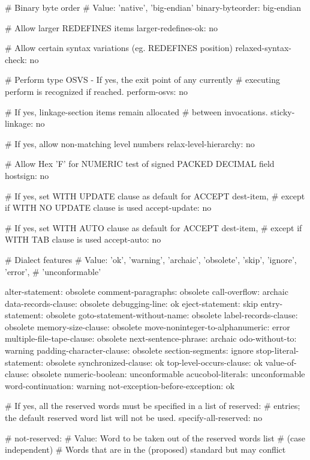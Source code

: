 # Binary byte order
# Value: 'native', 'big-endian'
binary-byteorder:		big-endian

# Allow larger REDEFINES items
larger-redefines-ok:		no

# Allow certain syntax variations (eg. REDEFINES position)
relaxed-syntax-check:		no

# Perform type OSVS - If yes, the exit point of any currently
# executing perform is recognized if reached.
perform-osvs:			no

# If yes, linkage-section items remain allocated
# between invocations.
sticky-linkage:			no

# If yes, allow non-matching level numbers
relax-level-hierarchy:		no

# Allow Hex 'F' for NUMERIC test of signed PACKED DECIMAL field
hostsign:			no

# If yes, set WITH UPDATE clause as default for ACCEPT dest-item,
# except if WITH NO UPDATE clause is used
accept-update:		no

# If yes, set WITH AUTO clause as default for ACCEPT dest-item,
# except if WITH TAB clause is used
accept-auto:		no

# Dialect features
# Value: 'ok', 'warning', 'archaic', 'obsolete', 'skip', 'ignore', 'error',
#        'unconformable'

alter-statement:			obsolete
comment-paragraphs:			obsolete
call-overflow:				archaic
data-records-clause:			obsolete
debugging-line:				ok
eject-statement:			skip
entry-statement:			obsolete
goto-statement-without-name:		obsolete
label-records-clause:			obsolete
memory-size-clause:			obsolete
move-noninteger-to-alphanumeric:	error
multiple-file-tape-clause:		obsolete
next-sentence-phrase:			archaic
odo-without-to:				warning
padding-character-clause:		obsolete
section-segments:			ignore
stop-literal-statement:			obsolete
synchronized-clause:			ok
top-level-occurs-clause:		ok
value-of-clause:			obsolete
numeric-boolean:			unconformable
acucobol-literals:			unconformable
word-continuation:			warning
not-exception-before-exception:		ok

# If yes, all the reserved words must be specified in a list of reserved:
# entries; the default reserved word list will not be used.
specify-all-reserved: no

# not-reserved:
# Value: Word to be taken out of the reserved words list
# (case independent)
# Words that are in the (proposed) standard but may conflict

